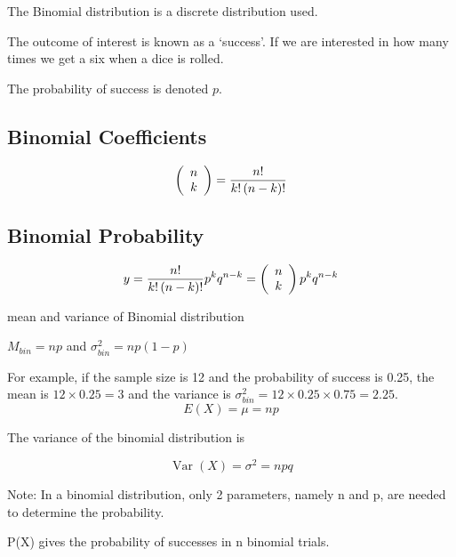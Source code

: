 \documentclass[a4paper,12pt]{article}
\begin{document}

The Binomial distribution is a discrete distribution used.


The outcome of interest is known as a `success'. If we are
interested in how many times we get a six when a dice is rolled.

The probability of success is denoted $p$.

\subsection{Binomial Coefficients}
\[
\left( {\begin{array}{*{20}c} n \\ k \\ \end{array}} \right) =
\frac{{n!}}{{k!\left( {n - k} \right)!}} \]


\subsection{Binomial Probability}
\[y = \frac{{n!}}{{k!\left( {n - k} \right)!}}p^k q^{n - k} = \left( {\begin{array}{*{20}c} n \\ k \\ \end{array}} \right)p^k q^{n -
	k}\]

mean and variance of Binomial distribution

$M_{bin} = np$  and $\sigma ^2 _{bin} = np(1-p)$

For example, if the sample size is 12 and the probability of
success is 0.25, the mean is $12 \times 0.25 = 3$ and the variance
is $\sigma ^2 _{bin} = 12 \times 0.25 \times 0.75 = 2.25$.
\[E(X) = \mu = np\]


The variance of the binomial distribution is

\[ \operatorname{Var}(X) = \sigma^2 = npq\]

Note: In a binomial distribution, only 2 parameters, namely n and p, are needed to determine the probability.


P(X) gives the probability of successes in n binomial trials.
\end{document}
